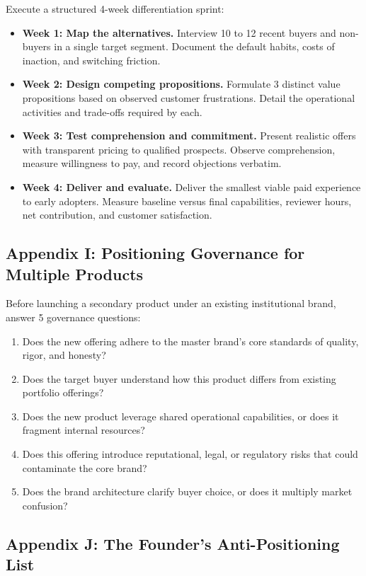 Execute a structured 4-week differentiation sprint:
\begin{itemize}
    \item \textbf{Week 1: Map the alternatives.} Interview 10 to 12 recent buyers and non-buyers in a single target segment. Document the default habits, costs of inaction, and switching friction.
    \item \textbf{Week 2: Design competing propositions.} Formulate 3 distinct value propositions based on observed customer frustrations. Detail the operational activities and trade-offs required by each.
    \item \textbf{Week 3: Test comprehension and commitment.} Present realistic offers with transparent pricing to qualified prospects. Observe comprehension, measure willingness to pay, and record objections verbatim.
    \item \textbf{Week 4: Deliver and evaluate.} Deliver the smallest viable paid experience to early adopters. Measure baseline versus final capabilities, reviewer hours, net contribution, and customer satisfaction.
\end{itemize}

\subsection*{Appendix I: Positioning Governance for Multiple Products}

Before launching a secondary product under an existing institutional brand, answer 5 governance questions:
\begin{enumerate}
    \item Does the new offering adhere to the master brand's core standards of quality, rigor, and honesty?
    \item Does the target buyer understand how this product differs from existing portfolio offerings?
    \item Does the new product leverage shared operational capabilities, or does it fragment internal resources?
    \item Does this offering introduce reputational, legal, or regulatory risks that could contaminate the core brand?
    \item Does the brand architecture clarify buyer choice, or does it multiply market confusion?
\end{enumerate}

\subsection*{Appendix J: The Founder's Anti-Positioning List}

